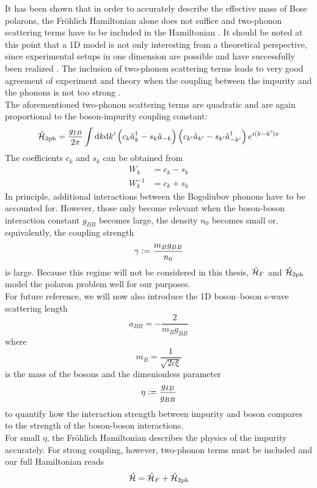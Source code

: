 It has been shown that in order to accurately describe the effective mass of Bose polarons, the Fröhlich Hamiltonian alone does not suffice and two-phonon scattering terms have to be included in the Hamiltonian \cite{Grusdt_2017}. It should be noted at this point that a 1D model is not only interesting from a theoretical perspective, since experimental setups in one dimension are possible and have successfully been realized \cite{Catani}. The inclusion of two-phonon scattering terms leads to very good agreement of experiment and theory when the coupling between the impurity and the phonons is not too strong \cite{Grusdt_2017}. \\
The aforementioned two-phonon scattering terms are quadratic and are again proportional to the boson-impurity coupling constant:
\begin{equation}
\hat{\mathcal{H}}_{2\mathrm{ph}}=\frac{g_{IB}}{2\pi}\int\mathrm d k\mathrm d k^\prime \left(c_k\hat a^\dagger_k-s_k\hat a_{-k}\right)\left(c_{k^\prime}\hat a_{k^\prime}-s_{k^\prime}\hat a^\dagger_{-k^\prime}\right)e^{i(k-k^\prime)x}
\end{equation}
The coefficients $c_k$ and $s_k$ can be obtained from 
\begin{subequations}
\begin{align}
W_k &= c_k - s_k\\
W_k^{-1} &= c_k + s_k
\end{align}
\end{subequations}
In principle, additional interactions between the Bogoliubov phonons have to be accounted for. However, those only become relevant when the boson-boson interaction constant $g_{BB}$ becomes large, the density $n_0$ becomes small or, equivalently, the coupling strength \begin{equation}\gamma\vcentcolon=\frac{m_B g_{BB}}{n_0}\end{equation} is large. Because this regime will not be considered in this thesis, $\hat{\mathcal{H}}_F$ and $\hat{\mathcal{H}}_{2\mathrm{ph}}$ model the polaron problem well for our purposes.\\
For future reference, we will now also introduce the 1D boson–boson s-wave scattering length 
\begin{equation}
a_{BB}=-\frac{2}{m_Bg_{BB}}
\end{equation}
where \begin{equation}m_B = \frac{1}{\sqrt{2c\xi}}\end{equation} is the mass of the bosons
and the dimenionless parameter 
\begin{equation}
\eta\vcentcolon= \frac{g_{IB}}{g_{BB}}
\end{equation}
to quantify how the interaction strength between impurity and boson compares to the strength of the boson-boson interactions.\\
For small $\eta$, the Fröhlich Hamiltonian describes the physics of the impurity accurately. For strong coupling, however, two-phonon terms must be included and our full Hamiltonian reads
\begin{equation}\label{full_ham}
\hat{\mathcal{H}} = \hat{\mathcal{H}}_F + \hat{\mathcal{H}}_{2\mathrm{ph}}
\end{equation}
